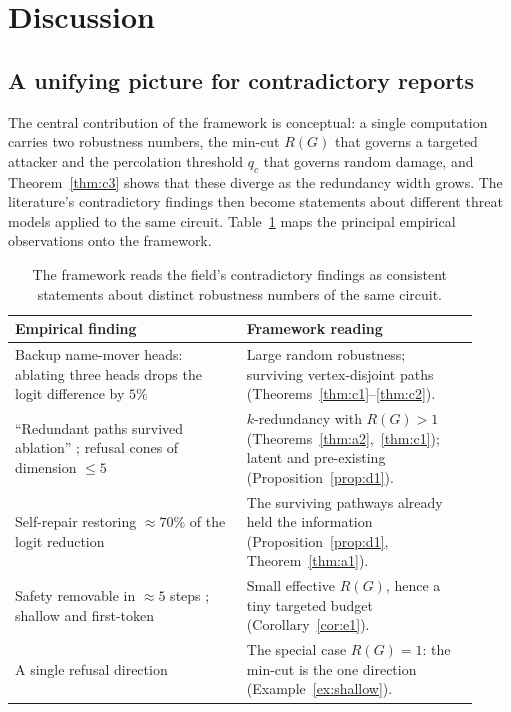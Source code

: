 \section{Discussion}
\label{sec:discussion}

\subsection{A unifying picture for contradictory reports}

The central contribution of the framework is conceptual: a single computation carries
two robustness numbers, the min-cut $R(G)$ that governs a targeted attacker and the
percolation threshold $q_c$ that governs random damage, and Theorem~\ref{thm:c3} shows
that these diverge as the redundancy width grows. The literature's contradictory
findings then become statements about different threat models applied to the same
circuit. Table~\ref{tab:reconcile} maps the principal empirical observations onto the
framework.

\begin{table}[ht]
\centering
\caption{The framework reads the field's contradictory findings as consistent
statements about distinct robustness numbers of the same circuit.}
\label{tab:reconcile}
\renewcommand{\arraystretch}{1.2}
\begin{tabular}{p{0.46\linewidth}p{0.46\linewidth}}
\toprule
\textbf{Empirical finding} & \textbf{Framework reading} \\
\midrule
Backup name-mover heads: ablating three heads drops the logit difference by
$5\%$ \cite{wang2022ioi} &
Large random robustness; surviving vertex-disjoint paths
(Theorems~\ref{thm:c1}--\ref{thm:c2}). \\
``Redundant paths survived ablation'' \cite{joad2026directions}; refusal cones of
dimension $\le 5$ \cite{wollschlager2025cones} &
$k$-redundancy with $R(G)>1$ (Theorems~\ref{thm:a2},~\ref{thm:c1}); latent and
pre-existing (Proposition~\ref{prop:d1}). \\
Self-repair restoring $\approx 70\%$ of the logit reduction \cite{mcgrath2023hydra} &
The surviving pathways already held the information
(Proposition~\ref{prop:d1}, Theorem~\ref{thm:a1}). \\
Safety removable in $\approx 5$ steps \cite{qi2023finetuning}; shallow and
first-token \cite{qi2024shallow} &
Small effective $R(G)$, hence a tiny targeted budget
(Corollary~\ref{cor:e1}). \\
A single refusal direction \cite{arditi2024refusal} &
The special case $R(G)=1$: the min-cut is the one direction
(Example~\ref{ex:shallow}). \\
\bottomrule
\end{tabular}
\end{table}

